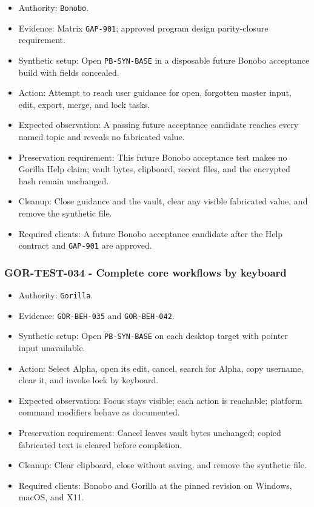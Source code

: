 \documentclass[
  letterpaper,
]{article}
\newcommand{\passthrough}[1]{#1}
\providecommand{\tightlist}{%
  \setlength{\itemsep}{0pt}\setlength{\parskip}{0pt}}
\begin{document}
\begin{itemize}
\tightlist
\item
  Authority: \passthrough{\lstinline!Bonobo!}.
\item
  Evidence: Matrix \passthrough{\lstinline!GAP-901!}; approved program design parity-closure requirement.
\item
  Synthetic setup: Open \nolinkurl{PB-SYN-BASE} in a disposable future Bonobo acceptance build with fields concealed.
\item
  Action: Attempt to reach user guidance for open, forgotten master input, edit, export, merge, and lock tasks.
\item
  Expected observation: A passing future acceptance candidate reaches every named topic and reveals no fabricated value.
\item
  Preservation requirement: This future Bonobo acceptance test makes no Gorilla Help claim; vault bytes, clipboard,
  recent files, and the encrypted hash remain unchanged.
\item
  Cleanup: Close guidance and the vault, clear any visible fabricated value, and remove the synthetic file.
\item
  Required clients: A future Bonobo acceptance candidate after the Help contract and \passthrough{\lstinline!GAP-901!}
  are approved.
\end{itemize}

\subsubsection{GOR-TEST-034 - Complete core workflows by
keyboard}\label{gor-test-034---complete-core-workflows-by-keyboard}

\begin{itemize}
\tightlist
\item
  Authority: \passthrough{\lstinline!Gorilla!}.
\item
  Evidence: \nolinkurl{GOR-BEH-035} and \nolinkurl{GOR-BEH-042}.
\item
  Synthetic setup: Open \nolinkurl{PB-SYN-BASE} on each desktop target with pointer input unavailable.
\item
  Action: Select Alpha, open its edit, cancel, search for Alpha, copy username, clear it, and invoke lock by keyboard.
\item
  Expected observation: Focus stays visible; each action is reachable; platform command modifiers behave as documented.
\item
  Preservation requirement: Cancel leaves vault bytes unchanged; copied fabricated text is cleared before completion.
\item
  Cleanup: Clear clipboard, close without saving, and remove the synthetic file.
\item
  Required clients: Bonobo and Gorilla at the pinned revision on Windows, macOS, and X11.
\end{itemize}
\end{document}

